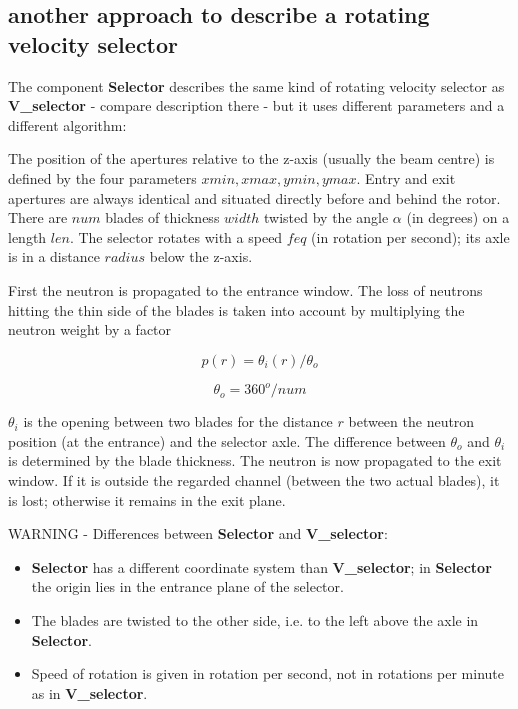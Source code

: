 \subsection*{another approach to describe a rotating velocity selector}
\label{selector}


The component \textbf{Selector} describes the same kind of rotating velocity selector as \textbf{V\_selector} - compare
description there - but it uses different parameters and a different algorithm:

The position of the apertures relative to the z-axis (usually the beam centre) is defined by the four parameters
$xmin, xmax, ymin, ymax$. Entry and exit apertures are always identical and situated directly before and behind
the rotor.
There are $num$ blades of thickness $width$ twisted by the angle $\alpha$ (in degrees) on a length $len$.
The selector rotates with a speed $feq$ (in rotation per second); its axle is in a distance $radius$ below the z-axis.

First the neutron is propagated to the entrance window. The loss of neutrons hitting the thin side
of the blades is taken into account by multiplying the neutron weight by a factor

\begin{equation}
   p(r) = \theta_i(r) / \theta_o
\end{equation}

\begin{equation}
   \theta_o = 360^o / num
\end{equation}

$\theta_i$ is the opening between two blades for the distance $r$ between the neutron position (at the entrance)
and the selector axle. The difference between $\theta_o$ and $\theta_i$ is determined by the blade thickness.
The neutron is now propagated to the exit window. If it is outside the regarded channel (between the two actual
blades), it is lost; otherwise it remains in the exit plane.

WARNING - Differences between \textbf{Selector} and \textbf{V\_selector}:
\begin{itemize}
\item \textbf{Selector} has a different coordinate system than \textbf{V\_selector};
in \textbf{Selector} the origin lies in the entrance plane of the selector.
\item The blades are twisted to the other side, i.e. to the left above the axle in \textbf{Selector}.
\item Speed of rotation is given in rotation per second, not in rotations per minute as in \textbf{V\_selector}.
\end{itemize}



